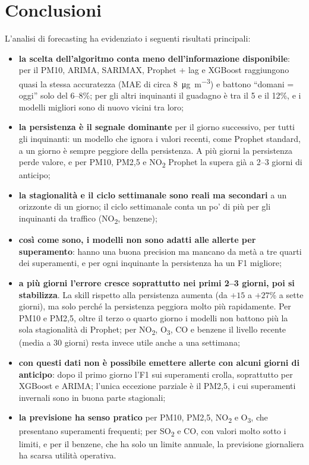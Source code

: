 \documentclass[11pt]{report}
\begin{document}
\section{Conclusioni}
\label{sec:fc_conclusioni}

L'analisi di forecasting ha evidenziato i seguenti risultati principali:
\begin{itemize}
  \item \textbf{la scelta dell'algoritmo conta meno dell'informazione
        disponibile}: per il PM10, ARIMA, SARIMAX, Prophet + lag e XGBoost
        raggiungono quasi la stessa accuratezza (MAE di circa
        \SI{8}{\micro\gram\per\cubic\metre}) e battono ``domani = oggi'' solo del
        6--8\%; per gli altri inquinanti il guadagno è tra il 5 e il 12\%, e i
        modelli migliori sono di nuovo vicini tra loro;
  \item \textbf{la persistenza è il segnale dominante} per il giorno successivo,
        per tutti gli inquinanti: un modello che ignora i valori recenti, come
        Prophet standard, a un giorno è sempre peggiore della persistenza. A più
        giorni la persistenza perde valore, e per PM10, PM2,5 e NO\textsubscript{2}
        Prophet la supera già a 2--3 giorni di anticipo;
  \item \textbf{la stagionalità e il ciclo settimanale sono reali ma secondari} a
        un orizzonte di un giorno; il ciclo settimanale conta un po' di più per gli
        inquinanti da traffico (NO\textsubscript{2}, benzene);
  \item \textbf{così come sono, i modelli non sono adatti alle allerte per
        superamento}: hanno una buona precision ma mancano da metà a tre quarti dei
        superamenti, e per ogni inquinante la persistenza ha un F1 migliore;
  \item \textbf{a più giorni l'errore cresce soprattutto nei primi 2--3 giorni,
        poi si stabilizza}. La skill rispetto alla persistenza aumenta (da $+15$ a
        $+27$\% a sette giorni), ma solo perché la persistenza peggiora molto più
        rapidamente. Per PM10 e PM2,5, oltre il terzo o quarto giorno i modelli non
        battono più la sola stagionalità di Prophet; per NO\textsubscript{2},
        O\textsubscript{3}, CO e benzene il livello recente (media a 30 giorni)
        resta invece utile anche a una settimana;
  \item \textbf{con questi dati non è possibile emettere allerte con alcuni giorni
        di anticipo}: dopo il primo giorno l'F1 sui superamenti crolla,
        soprattutto per XGBoost e ARIMA; l'unica eccezione parziale è il PM2,5, i
        cui superamenti invernali sono in buona parte stagionali;
  \item \textbf{la previsione ha senso pratico} per PM10, PM2,5,
        NO\textsubscript{2} e O\textsubscript{3}, che presentano superamenti
        frequenti; per SO\textsubscript{2} e CO, con valori molto sotto i limiti, e
        per il benzene, che ha solo un limite annuale, la previsione giornaliera ha
        scarsa utilità operativa.
\end{itemize}
\end{document}
